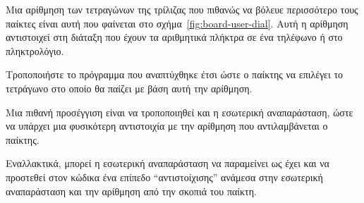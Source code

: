 \documentclass[a4paper,11pt,oneside]{book}
\begin{document}
\begin{exercise}
Μια %
αρίθμηση των τετραγώνων της τρίλιζας που πιθανώς να βόλευε περισσότερο τους παίκτες είναι αυτή που φαίνεται στο σχήμα~\ref{fig:board-user-dial}. Αυτή η αρίθμηση αντιστοιχεί στη διάταξη που έχουν τα αριθμητικά πλήκτρα σε ένα τηλέφωνο ή στο πληκτρολόγιο.

Τροποποιήστε το πρόγραμμα που αναπτύχθηκε έτσι ώστε ο παίκτης να επιλέγει το τετράγωνο στο οποίο θα παίζει με βάση αυτή την αρίθμηση.

\begin{note}
Μια πιθανή προσέγγιση είναι να τροποποιηθεί και η εσωτερική αναπαράσταση, ώστε να υπάρχει μια φυσικότερη αντιστοιχία με την αρίθμηση που αντιλαμβάνεται ο παίκτης. 

Εναλλακτικά, μπορεί η εσωτερική αναπαράσταση να παραμείνει ως έχει και να προστεθεί στον κώδικα ένα επίπεδο ``αντιστοίχισης'' ανάμεσα στην εσωτερική αναπαράσταση και την αρίθμηση από την σκοπιά του παίκτη.
\end{note} 
\end{exercise}
\end{document}
